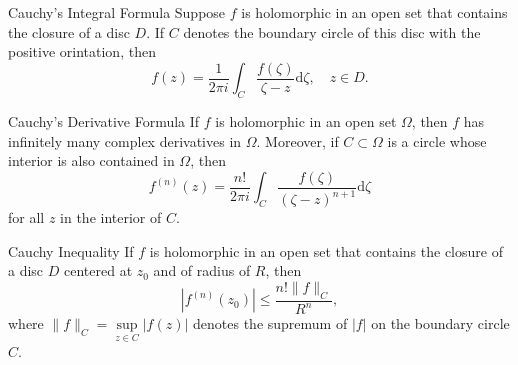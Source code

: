 \begin{theorem}{Cauchy's Integral Formula}{}
  Suppose $f$ is holomorphic in an open set that contains the closure of a disc $D$.
  If $C$ denotes the boundary circle of this disc with the positive orintation, then
  \begin{equation}
    f(z) = \frac{1}{2 \pi i} \int_C \frac{f(\zeta)}{\zeta - z}\mathrm{d} \zeta, \quad
    z \in D.
  \end{equation}
\end{theorem}

\begin{corollary}{Cauchy's Derivative Formula}{}
  If $f$ is holomorphic in an open set $\Omega$,
  then $f$ has infinitely many complex derivatives in $\Omega$.
  Moreover, if $C \subset \Omega$ is a circle whose interior is also contained in $\Omega$,
  then
  \begin{equation}
    f^{(n)}(z) = \frac{n!}{2 \pi i} \int_C \frac{f(\zeta)}{(\zeta - z)^{n+1}}\mathrm{d} \zeta
  \end{equation}
  for all $z$ in the interior of $C$.
\end{corollary}

\begin{corollary}{Cauchy Inequality}{}
  If $f$ is holomorphic in an open set that contains the closure of a disc $D$
  centered at $z_0$ and of radius of $R$, then
  \begin{equation}
    |f^{(n)}(z_0)| \leq \frac{n! \|f\|_C}{R^n},
  \end{equation}
  where $\|f\|_C = \sup \limits_{z \in C}|f(z)|$ denotes the supremum of $|f|$
  on the boundary circle $C$.
\end{corollary}


